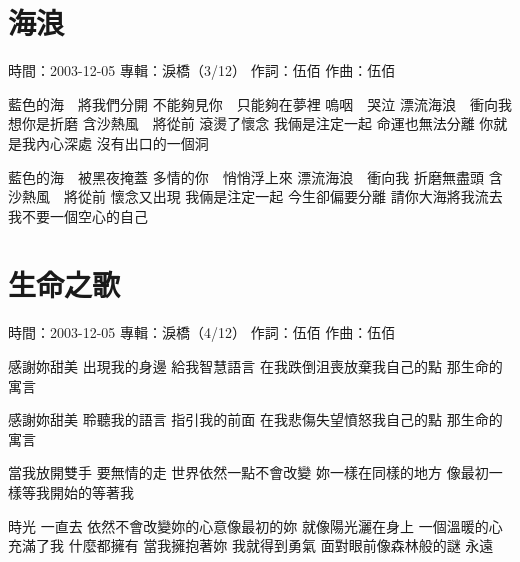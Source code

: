 \documentclass[UTF8,a4paper,oneside,twocolumn,12pt]{ctexbook}
\newcommand{\infopair}[2]{\textbullet #1：#2}
\newcommand{\zc}[1][伍佰]{\infopair{作詞}{#1}}
\newcommand{\zq}[1][伍佰]{\infopair{作曲}{#1}}
\newcommand{\zj}[1]{\infopair{專輯}{#1}}
\newcommand{\sj}[1]{\infopair{時間}{#1}}
\newenvironment{info}{\begin{flushleft}\kaishu
	}
	{\end{flushleft}\normalsize\yahei\par}
\newenvironment{lyric}{
	}
{}
\begin{document}
\section{海浪}
\begin{info}
	\sj{2003-12-05}
	\zj{淚橋（3/12）}
	\zc
	\zq
\end{info}
\begin{lyric}
	藍色的海　將我們分開
	不能夠見你　只能夠在夢裡
	嗚咽　哭泣
	漂流海浪　衝向我
	想你是折磨
	含沙熱風　將從前
	滾燙了懷念
	我倆是注定一起
	命運也無法分離
	你就是我內心深處
	沒有出口的一個洞

	藍色的海　被黑夜掩蓋
	多情的你　悄悄浮上來
	漂流海浪　衝向我
	折磨無盡頭
	含沙熱風　將從前
	懷念又出現
	我倆是注定一起
	今生卻偏要分離
	請你大海將我流去
	我不要一個空心的自己
\end{lyric}

\section{生命之歌}
\begin{info}
	\sj{2003-12-05}
	\zj{淚橋（4/12）}
	\zc
	\zq
\end{info}
\begin{lyric}
	感謝妳甜美 出現我的身邊 給我智慧語言
	在我跌倒沮喪放棄我自己的點 那生命的寓言

	感謝妳甜美 聆聽我的語言 指引我的前面
	在我悲傷失望憤怒我自己的點 那生命的寓言

	當我放開雙手 要無情的走 世界依然一點不會改變
	妳一樣在同樣的地方 像最初一樣等我開始的等著我

	時光 一直去 依然不會改變妳的心意像最初的妳
	就像陽光灑在身上 一個溫暖的心充滿了我 什麼都擁有
	當我擁抱著妳 我就得到勇氣 面對眼前像森林般的謎 永遠
\end{lyric}
\end{document}
